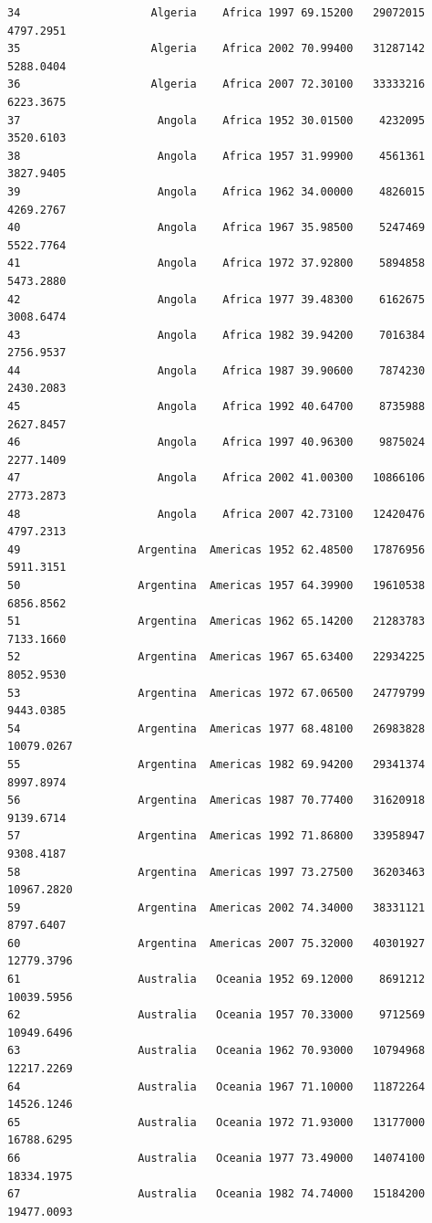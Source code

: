 \documentclass[
  letterpaper,
  DIV=11,
  numbers=noendperiod]{scrreprt}
\begin{document}
\begin{verbatim}
34                    Algeria    Africa 1997 69.15200   29072015   4797.2951
35                    Algeria    Africa 2002 70.99400   31287142   5288.0404
36                    Algeria    Africa 2007 72.30100   33333216   6223.3675
37                     Angola    Africa 1952 30.01500    4232095   3520.6103
38                     Angola    Africa 1957 31.99900    4561361   3827.9405
39                     Angola    Africa 1962 34.00000    4826015   4269.2767
40                     Angola    Africa 1967 35.98500    5247469   5522.7764
41                     Angola    Africa 1972 37.92800    5894858   5473.2880
42                     Angola    Africa 1977 39.48300    6162675   3008.6474
43                     Angola    Africa 1982 39.94200    7016384   2756.9537
44                     Angola    Africa 1987 39.90600    7874230   2430.2083
45                     Angola    Africa 1992 40.64700    8735988   2627.8457
46                     Angola    Africa 1997 40.96300    9875024   2277.1409
47                     Angola    Africa 2002 41.00300   10866106   2773.2873
48                     Angola    Africa 2007 42.73100   12420476   4797.2313
49                  Argentina  Americas 1952 62.48500   17876956   5911.3151
50                  Argentina  Americas 1957 64.39900   19610538   6856.8562
51                  Argentina  Americas 1962 65.14200   21283783   7133.1660
52                  Argentina  Americas 1967 65.63400   22934225   8052.9530
53                  Argentina  Americas 1972 67.06500   24779799   9443.0385
54                  Argentina  Americas 1977 68.48100   26983828  10079.0267
55                  Argentina  Americas 1982 69.94200   29341374   8997.8974
56                  Argentina  Americas 1987 70.77400   31620918   9139.6714
57                  Argentina  Americas 1992 71.86800   33958947   9308.4187
58                  Argentina  Americas 1997 73.27500   36203463  10967.2820
59                  Argentina  Americas 2002 74.34000   38331121   8797.6407
60                  Argentina  Americas 2007 75.32000   40301927  12779.3796
61                  Australia   Oceania 1952 69.12000    8691212  10039.5956
62                  Australia   Oceania 1957 70.33000    9712569  10949.6496
63                  Australia   Oceania 1962 70.93000   10794968  12217.2269
64                  Australia   Oceania 1967 71.10000   11872264  14526.1246
65                  Australia   Oceania 1972 71.93000   13177000  16788.6295
66                  Australia   Oceania 1977 73.49000   14074100  18334.1975
67                  Australia   Oceania 1982 74.74000   15184200  19477.0093

\end{verbatim}
\end{document}
